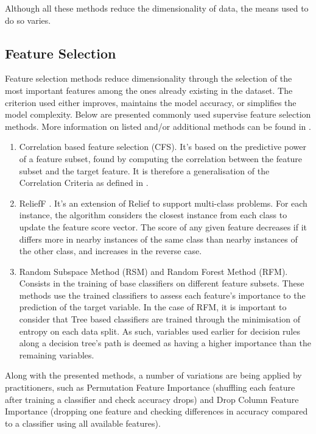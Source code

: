 \documentclass[12pt, english, openany]{book}
\begin{document}
Although all these methods reduce the dimensionality of data, the means used to
do so varies.

\subsection*{Feature Selection}

Feature selection methods reduce dimensionality through the selection of the
most important features among the ones already existing in the dataset. The
criterion used either improves, maintains the model accuracy, or simplifies the
model complexity. Below are presented commonly used supervise feature selection
methods. More information on listed and/or additional methods can be found in
\cite{Cai2018, Ghojogh2019}.

\begin{enumerate}
  \item Correlation based feature selection (CFS). It's based on the predictive power
        of a feature subset, found by computing the correlation between the feature
        subset and the target feature. It is therefore a generalisation of the
        Correlation Criteria as defined in \cite{Ghojogh2019}.
  \item ReliefF \cite{kononenko1997}. It's an extension of Relief
        \cite{kira1992} to support multi-class problems. For each instance, the
        algorithm considers the closest instance from each class to update the feature
        score vector. The score of any given feature decreases if it differs more in
        nearby instances of the same class than nearby instances of the other class,
        and increases in the reverse case. %
  \item Random Subspace Method (RSM) and Random Forest Method (RFM). Consists in the
        training of base classifiers on different feature subsets. These methods use
        the trained classifiers to assess each feature's importance to the prediction
        of the target variable. In the case of RFM, it is important to consider that
        Tree based classifiers are trained through the minimisation of entropy on each
        data split. As such, variables used earlier for decision rules along a decision
        tree's path is deemed as having a higher importance than the remaining
        variables.
\end{enumerate}

Along with the presented methods, a number of variations are being applied by
practitioners, such as Permutation Feature Importance (shuffling each feature
after training a classifier and check accuracy drops) and Drop Column Feature
Importance (dropping one feature and checking differences in accuracy compared
to a classifier using all available features).
\end{document}
